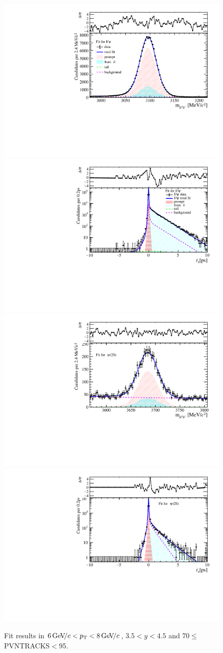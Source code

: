 \begin{figure}[H]
\begin{center}
\includegraphics[width=0.47\linewidth]{pdf/Jpsi/drawmass/n4y3pt4.pdf}
\includegraphics[width=0.47\linewidth]{pdf/Jpsi/2DFit/n4y3pt4.pdf}
\vspace*{-0.5cm}
\includegraphics[width=0.47\linewidth]{pdf/Psi2S/drawmass/n4y3pt4.pdf}
\includegraphics[width=0.47\linewidth]{pdf/Psi2S/2DFit/n4y3pt4.pdf}
\vspace*{-0.5cm}
\end{center}
\caption{Fit results in $6\text{\,Ge\kern -0.1em V\!/}c<p_{\mathrm{T}}<8\text{\,Ge\kern -0.1em V\!/}c$, $3.5<y<4.5$ and 70$\leq$PVNTRACKS$<$95.}
\label{Fitn4y3pt4}
\end{figure}
